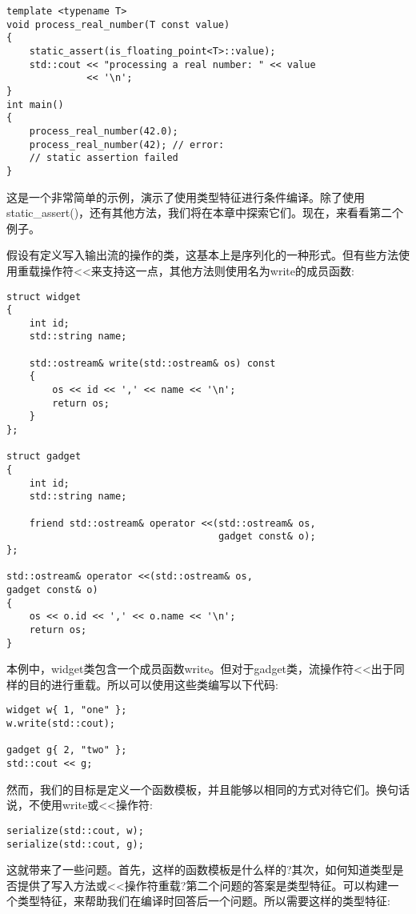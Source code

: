 \begin{lstlisting}[style=styleCXX]
template <typename T>
void process_real_number(T const value)
{
	static_assert(is_floating_point<T>::value);
	std::cout << "processing a real number: " << value
			  << '\n';
}
int main()
{
	process_real_number(42.0);
	process_real_number(42); // error:
	// static assertion failed
}
\end{lstlisting}

这是一个非常简单的示例，演示了使用类型特征进行条件编译。除了使用static\_assert()，还有其他方法，我们将在本章中探索它们。现在，来看看第二个例子。

假设有定义写入输出流的操作的类，这基本上是序列化的一种形式。但有些方法使用重载操作符<{}<来支持这一点，其他方法则使用名为write的成员函数:

\begin{lstlisting}[style=styleCXX]
struct widget
{
	int id;
	std::string name;
	
	std::ostream& write(std::ostream& os) const
	{
		os << id << ',' << name << '\n';
		return os;
	}
};

struct gadget
{
	int id;
	std::string name;
	
	friend std::ostream& operator <<(std::ostream& os,
	                                 gadget const& o);
};

std::ostream& operator <<(std::ostream& os,
gadget const& o)
{
	os << o.id << ',' << o.name << '\n';
	return os;
}
\end{lstlisting}

本例中，widget类包含一个成员函数write。但对于gadget类，流操作符<{}<出于同样的目的进行重载。所以可以使用这些类编写以下代码:

\begin{lstlisting}[style=styleCXX]
widget w{ 1, "one" };
w.write(std::cout);

gadget g{ 2, "two" };
std::cout << g;
\end{lstlisting}

然而，我们的目标是定义一个函数模板，并且能够以相同的方式对待它们。换句话说，不使用write或<{}<操作符:

\begin{lstlisting}[style=styleCXX]
serialize(std::cout, w);
serialize(std::cout, g);
\end{lstlisting}

这就带来了一些问题。首先，这样的函数模板是什么样的?其次，如何知道类型是否提供了写入方法或<{}<操作符重载?第二个问题的答案是类型特征。可以构建一个类型特征，来帮助我们在编译时回答后一个问题。所以需要这样的类型特征:

